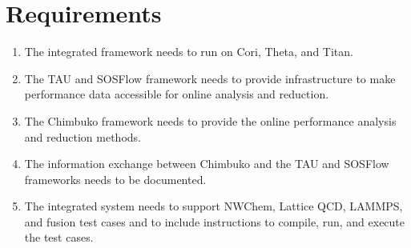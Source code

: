 \section{Requirements}

\begin{enumerate}[label=R-\arabic*)]
\item The integrated framework needs to run on Cori, Theta, and Titan.
\item The TAU and SOSFlow framework needs to provide infrastructure to make performance data accessible for online analysis and reduction.
\item The Chimbuko framework needs to provide the online performance analysis and reduction methods.
\item The information exchange between Chimbuko and the TAU and SOSFlow frameworks needs to be documented.
\item The integrated system needs to support NWChem, Lattice QCD, LAMMPS, and fusion test cases and to include instructions to compile, run, and execute the test cases.
\end{enumerate}

